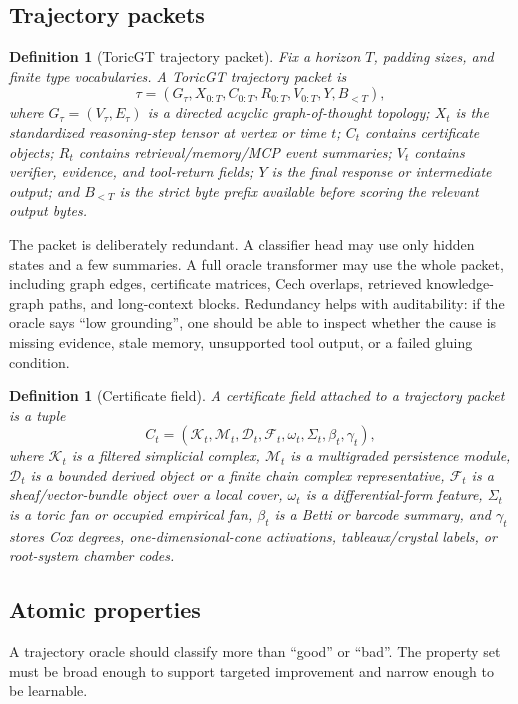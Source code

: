 \documentclass[11pt]{article}
\newtheorem{definition}[theorem]{Definition}
\newcommand{\calD}{\mathcal{D}}
\newcommand{\calF}{\mathcal{F}}
\newcommand{\calK}{\mathcal{K}}
\newcommand{\calM}{\mathcal{M}}
\numberwithin{equation}{section}
\begin{document}
\subsection{Trajectory packets}
\begin{definition}[ToricGT trajectory packet]
Fix a horizon $T$, padding sizes, and finite type vocabularies. A ToricGT trajectory packet is
\begin{equation}
\tau = (G_\tau, X_{0:T}, C_{0:T}, R_{0:T}, V_{0:T}, Y, B_{<T}),
\end{equation}
where $G_\tau=(V_\tau,E_\tau)$ is a directed acyclic graph-of-thought topology; $X_t$ is the standardized reasoning-step tensor at vertex or time $t$; $C_t$ contains certificate objects; $R_t$ contains retrieval/memory/MCP event summaries; $V_t$ contains verifier, evidence, and tool-return fields; $Y$ is the final response or intermediate output; and $B_{<T}$ is the strict byte prefix available before scoring the relevant output bytes.
\end{definition}

The packet is deliberately redundant. A classifier head may use only hidden states and a few summaries. A full oracle transformer may use the whole packet, including graph edges, certificate matrices, Cech overlaps, retrieved knowledge-graph paths, and long-context blocks. Redundancy helps with auditability: if the oracle says ``low grounding'', one should be able to inspect whether the cause is missing evidence, stale memory, unsupported tool output, or a failed gluing condition.

\begin{definition}[Certificate field]
A certificate field attached to a trajectory packet is a tuple
\begin{equation}
C_t=(\calK_t,\calM_t,\calD_t,\calF_t,\omega_t,\Sigma_t,\beta_t,\gamma_t),
\end{equation}
where $\calK_t$ is a filtered simplicial complex, $\calM_t$ is a multigraded persistence module, $\calD_t$ is a bounded derived object or a finite chain complex representative, $\calF_t$ is a sheaf/vector-bundle object over a local cover, $\omega_t$ is a differential-form feature, $\Sigma_t$ is a toric fan or occupied empirical fan, $\beta_t$ is a Betti or barcode summary, and $\gamma_t$ stores Cox degrees, one-dimensional-cone activations, tableaux/crystal labels, or root-system chamber codes.
\end{definition}

\subsection{Atomic properties}
A trajectory oracle should classify more than ``good'' or ``bad''. The property set must be broad enough to support targeted improvement and narrow enough to be learnable.
\end{document}
